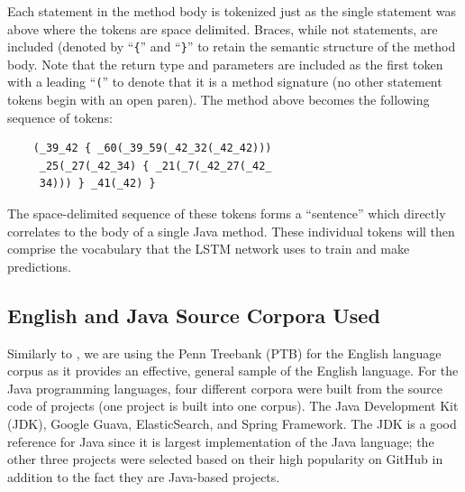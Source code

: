 \documentclass{article}
\begin{document}
Each statement in the method body is tokenized just as the single statement 
was above where the tokens are space delimited. Braces, while not 
statements, are included (denoted by ``\texttt\{'' and
``\texttt\}''  to retain the semantic structure of the method body. 
Note that the return type and parameters are included as the first 
token with a leading ``\texttt('' to denote that it is a method
signature (no other statement tokens begin with an open paren).
The method above becomes the following sequence of tokens:

\begin{verbatim}
    (_39_42 { _60(_39_59(_42_32(_42_42)))
     _25(_27(_42_34) { _21(_7(_42_27(_42_
     34))) } _41(_42) } 
\end{verbatim}

The space-delimited sequence of these tokens forms a ``sentence'' which  
directly  correlates to the body of a single Java method. These individual  
tokens will then comprise the vocabulary that the LSTM network uses to train 
and make predictions.

\subsection{English and Java Source Corpora Used}

Similarly to \citet{LSTMArticle}, we are using the Penn Treebank (PTB) for the
English language corpus as it provides an effective, general sample of the English
language. %
For the Java programming languages, four different corpora were built from
the source code of projects (one project is built into one corpus). The
Java Development Kit (JDK), Google Guava, ElasticSearch, and Spring Framework.
The JDK is a good reference for Java since it is largest implementation
of the Java language; the other three projects were selected based on their
high popularity on GitHub in addition to the fact they are
Java-based projects.
\end{document}
